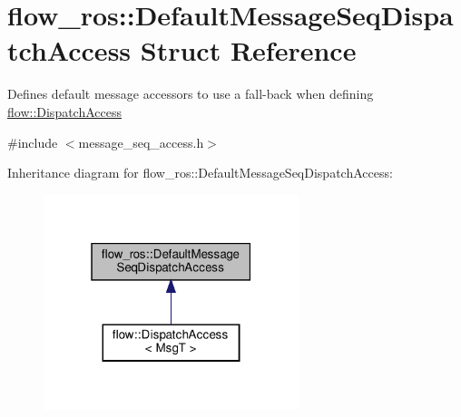 \hypertarget{structflow__ros_1_1_default_message_seq_dispatch_access}{}\section{flow\+\_\+ros\+:\+:Default\+Message\+Seq\+Dispatch\+Access Struct Reference}
\label{structflow__ros_1_1_default_message_seq_dispatch_access}


Defines default message accessors to use a fall-\/back when defining {\ttfamily \hyperlink{structflow_1_1_dispatch_access}{flow\+::\+Dispatch\+Access}}  




{\ttfamily \#include $<$message\+\_\+seq\+\_\+access.\+h$>$}



Inheritance diagram for flow\+\_\+ros\+:\+:Default\+Message\+Seq\+Dispatch\+Access\+:\nopagebreak
\begin{figure}[H]
\begin{center}
\leavevmode
\includegraphics[width=211pt]{structflow__ros_1_1_default_message_seq_dispatch_access__inherit__graph}
\end{center}
\end{figure}
